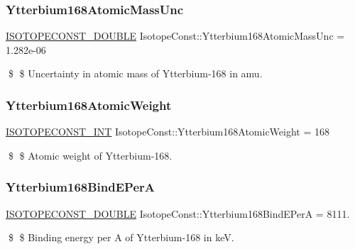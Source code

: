 \subsubsection{\texorpdfstring{Ytterbium168\+Atomic\+Mass\+Unc}{Ytterbium168AtomicMassUnc}}
{\footnotesize\ttfamily \mbox{\hyperlink{group___isotope_const-_macros_ga8f45a7272ce02c0b4c65c44636ed719a}{I\+S\+O\+T\+O\+P\+E\+C\+O\+N\+S\+T\+\_\+\+D\+O\+U\+B\+LE}} Isotope\+Const\+::\+Ytterbium168\+Atomic\+Mass\+Unc = 1.\+282e-\/06}

\$ \$ Uncertainty in atomic mass of Ytterbium-\/168 in amu. \mbox{\label{group___isotope_const-_ytterbium-_yb168_ga64d4c18e8f0d9437df5a52ebafdc637f}} 
\subsubsection{\texorpdfstring{Ytterbium168\+Atomic\+Weight}{Ytterbium168AtomicWeight}}
{\footnotesize\ttfamily \mbox{\hyperlink{group___isotope_const-_macros_ga5f18360b3e99483a35c32d789e62621c}{I\+S\+O\+T\+O\+P\+E\+C\+O\+N\+S\+T\+\_\+\+I\+NT}} Isotope\+Const\+::\+Ytterbium168\+Atomic\+Weight = 168}

\$ \$ Atomic weight of Ytterbium-\/168. \mbox{\label{group___isotope_const-_ytterbium-_yb168_gad478973586d636778d1cf3157ab5bcdb}} 
\subsubsection{\texorpdfstring{Ytterbium168\+Bind\+E\+PerA}{Ytterbium168BindEPerA}}
{\footnotesize\ttfamily \mbox{\hyperlink{group___isotope_const-_macros_ga8f45a7272ce02c0b4c65c44636ed719a}{I\+S\+O\+T\+O\+P\+E\+C\+O\+N\+S\+T\+\_\+\+D\+O\+U\+B\+LE}} Isotope\+Const\+::\+Ytterbium168\+Bind\+E\+PerA = 8111.}

\$ \$ Binding energy per A of Ytterbium-\/168 in keV. \mbox{\label{group___isotope_const-_ytterbium-_yb168_gad8b78e420dfaf93e6b2454436d19865d}} 
